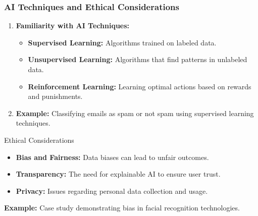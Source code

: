 \documentclass[aspectratio=169]{beamer}
\begin{document}
\begin{frame}[fragile]
    \frametitle{AI Techniques and Ethical Considerations}
    \begin{enumerate}
        \item \textbf{Familiarity with AI Techniques:}
        \begin{itemize}
            \item \textbf{Supervised Learning:} Algorithms trained on labeled data.
            \item \textbf{Unsupervised Learning:} Algorithms that find patterns in unlabeled data.
            \item \textbf{Reinforcement Learning:} Learning optimal actions based on rewards and punishments.
        \end{itemize}
        \item \textbf{Example:} Classifying emails as spam or not spam using supervised learning techniques.
    \end{enumerate}

    \begin{block}{Ethical Considerations}
        \begin{itemize}
            \item \textbf{Bias and Fairness:} Data biases can lead to unfair outcomes.
            \item \textbf{Transparency:} The need for explainable AI to ensure user trust.
            \item \textbf{Privacy:} Issues regarding personal data collection and usage.
        \end{itemize}
        \item \textbf{Example:} Case study demonstrating bias in facial recognition technologies.
    \end{block}
\end{frame}
\end{document}
